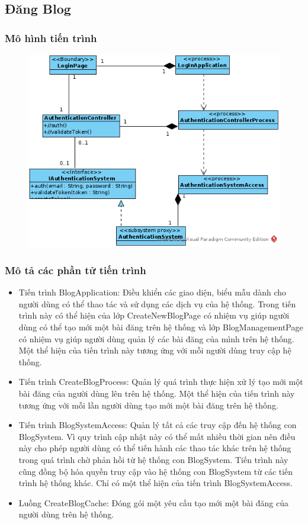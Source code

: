 \documentclass[./../main_file.tex]{subfiles}
\begin{document}
\subsection{Đăng Blog}

\subsubsection{Mô hình tiến trình}

\begin{figure}[H]
	\centering
	\includegraphics[width=\linewidth]{./images/pv_login.png}
\end{figure}

\subsubsection{Mô tả các phần tử tiến trình}
\begin{itemize}
	\item Tiến trình BlogApplication: Điều khiển các giao diện, biểu mẫu dành cho người dùng có thể thao tác và sử dụng các dịch vụ của hệ thống. Trong tiến trình này có thể hiện của lớp CreateNewBlogPage có nhiệm vụ giúp người dùng có thể tạo mới một bài đăng trên hệ thống và lớp BlogManagementPage có nhiệm vụ giúp người dùng quản lý các bài đăng của mình trên hệ thống.
	      Một thể hiện của tiến trình này tương ứng với mỗi người dùng truy cập hệ thống.
	\item Tiến trình CreateBlogProcess: Quản lý quá trình thực hiện xử lý tạo mới một bài đăng của người dùng lên trên hệ thống.
	      Một thể hiện của tiến trình này tương ứng với mỗi lần người dùng tạo mới một bài đăng trên hệ thống.
	\item Tiến trình BlogSystemAccess: Quản lý tất cả các truy cập đến hệ thống con BlogSystem. Vì quy trình cập nhật này có thể mất nhiều thời gian nên điều này cho phép người dùng có thể tiến hành các thao tác khác trên hệ thống trong quá trình chờ phản hồi từ hệ thống con BlogSystem. Tiến trình này cũng đồng bộ hóa quyền truy cập vào hệ thống con BlogSystem từ các tiến trình hệ thống khác.
	      Chỉ có một thể hiện của tiến trình BlogSystemAccess.
	\item Luồng CreateBlogCache: Đóng gói một yêu cầu tạo mới một bài đăng của người dùng trên hệ thống.
\end{itemize}
\end{document}
